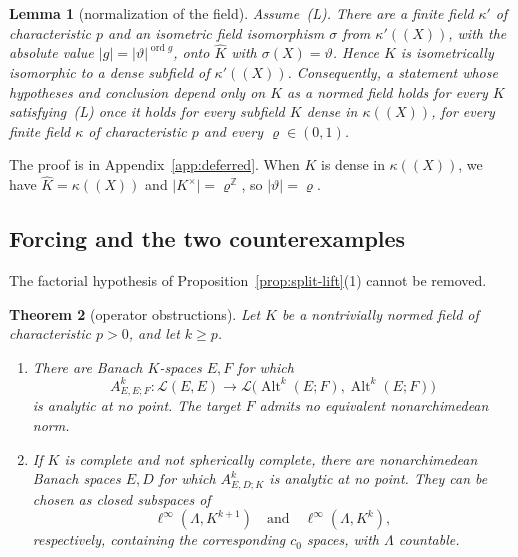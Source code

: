 \documentclass[11pt]{amsart}
\newtheorem{theorem}{Theorem}[section]
\newtheorem{lemma}[theorem]{Lemma}
\theoremstyle{definition}
\theoremstyle{remark}
\numberwithin{equation}{section}
\newcommand{\Z}{\mathbb Z}
\newcommand{\cL}{\mathcal L}
\newcommand{\Alt}{\operatorname{Alt}}
\newcommand{\linf}{\ell^\infty}
\newcommand{\abs}[1]{\lvert #1\rvert}
\newcommand{\ord}{\operatorname{ord}}
\newcommand{\Kh}{\widehat K}
\theoremstyle{plain}
\theoremstyle{definition}
\theoremstyle{plain}
\begin{document}
\begin{lemma}[normalization of the field]\label{obs:lem:normalization}
Assume~\textup{(L)}. There are a finite field $\kappa'$ of characteristic $p$ and an isometric field isomorphism
$\sigma$ from $\kappa'((X))$, with the absolute value $\abs g=\abs\vartheta^{\ord g}$, onto $\Kh$ with $\sigma(X)=\vartheta$.
Hence $K$ is isometrically isomorphic to a dense subfield of $\kappa'((X))$. Consequently, a statement whose hypotheses
and conclusion depend only on $K$ as a normed field holds for every $K$ satisfying~\textup{(L)} once it holds for every
subfield $K$ dense in $\kappa((X))$, for every finite field $\kappa$ of characteristic $p$ and every $\varrho\in(0,1)$.
\end{lemma}

The proof is in Appendix~\ref{app:deferred}. When $K$ is dense in $\kappa((X))$, we have $\Kh=\kappa((X))$ and
$\abs{K^\times}=\varrho^\Z$, so $\abs\vartheta=\varrho$.

\subsection{Forcing and the two counterexamples}\label{obs:ssec:counterexamples}
The factorial hypothesis of Proposition~\ref{prop:split-lift}(1) cannot be removed.

\begin{theorem}[operator obstructions]\label{thm:operator-obstructions}
Let $K$ be a nontrivially normed field of characteristic $p>0$, and let $k\ge p$.
\begin{enumerate}
\item There are Banach $K$\nobreakdash-spaces $E,F$ for which
\[
 A^k_{E,E;F}\colon\cL(E,E)\longrightarrow
 \cL\bigl(\Alt^k(E;F),\Alt^k(E;F)\bigr)
\]
is analytic at no point. The target $F$ admits no equivalent nonarchimedean norm.
\item If $K$ is complete and not spherically complete, there are nonarchimedean Banach spaces $E,D$ for which $A^k_{E,D;K}$ is analytic at no point. They can be chosen as closed subspaces of
\[
 \linf(\Lambda,K^{k+1})\quad\text{and}\quad\linf(\Lambda,K^k),
\]
respectively, containing the corresponding $c_0$ spaces, with $\Lambda$ countable.
\end{enumerate}
\end{theorem}
\end{document}

